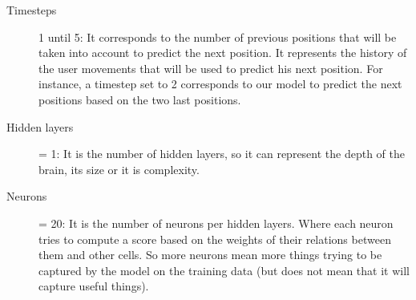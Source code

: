 \documentclass[a4]{article}
\begin{document}
\begin{description}
\item [Timesteps] 1 until 5: It corresponds to the number of previous positions that will be taken into account to predict the next position. It represents the history of the user movements that will be used to predict his next position. For instance, a timestep set to 2 corresponds to our model to predict the next positions based on the two last positions.
\item [Hidden layers] = 1: It is the number of hidden layers, so it can represent the depth of the brain, its size or it is complexity.
\item [Neurons] = 20: It is the number of neurons per hidden layers. Where each neuron tries to compute a score based on the weights of their relations between them and other cells. So more neurons mean more things trying to be captured by the model on the training data (but does not mean that it will capture useful things).
\end{description}
\end{document}
